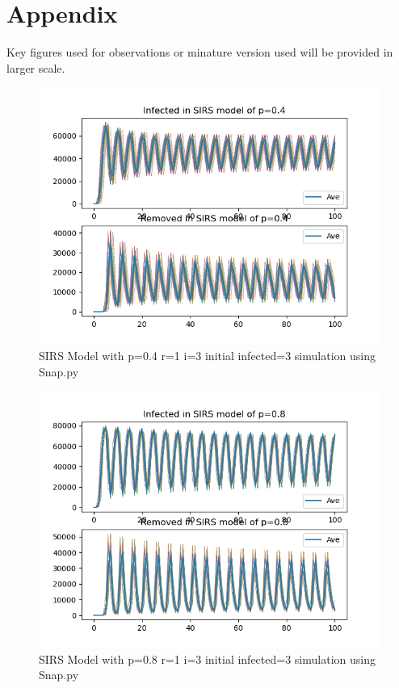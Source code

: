 \documentclass{subfile}
\begin{document}
  \section{Appendix}
  Key figures used for observations or minature version used will be provided in larger scale.
  \begin{figure}[!h]
  \includegraphics[scale=0.8]{sirsp04r1i3s3}
  \caption[SIRS p=0.4,r=1,i=3,init infected=3]{SIRS Model with p=0.4 r=1 i=3 initial infected=3 simulation using Snap.py}
  \label{fig:SIRS1}
  \end{figure}
  \begin{figure}
  \includegraphics[scale=0.8]{sirsp08r1i3s3}
  \caption[SIRS p=0.8,r=1,i=3,init infected=3]{SIRS Model with p=0.8 r=1 i=3 initial infected=3 simulation using Snap.py}
  \label{fig:SIRS2}
  \end{figure}
\end{document}
